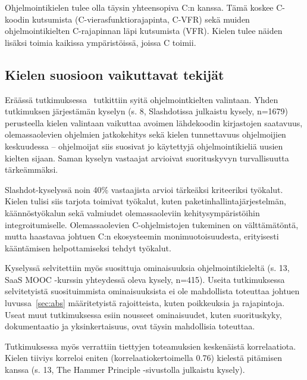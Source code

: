 Ohjelmointikielen tulee olla täysin yhteensopiva C:n kanssa. Tämä koskee
C-koodin kutsumista (C\hyp{}vierasfunktiorajapinta, C-VFR) sekä muiden ohjelmointikielten C-rajapinnan läpi
kutsumista (VFR). Kielen tulee näiden lisäksi toimia kaikissa ympäristöissä,
joissa C toimii.

\subsection{Kielen suosioon vaikuttavat tekijät}

Eräässä tutkimuksessa~\citep{empiricalpopularity} tutkittiin syitä
ohjelmointkielten valintaan. Yhden tutkimuksen järjestämän kyselyn (s. 8,
Slashdotissa julkaistu kysely, n=1679) perusteella kielen valintaan vaikuttaa
avoimen lähdekoodin kirjastojen saatavuus, olemassaolevien ohjelmien
jatkokehitys sekä kielen tunnettavuus ohjelmoijien keskuudessa -- ohjelmoijat
siis suosivat jo käytettyjä ohjelmointikieliä uusien kielten sijaan. Saman
kyselyn vastaajat arvioivat suorituskyvyn turvallisuutta tärkeämmäksi.

Slashdot-kyselyssä noin 40\% vastaajista arvioi tärkeäksi kriteeriksi työkalut.
Kielen tulisi siis tarjota toimivat työkalut, kuten
paketinhallintajärjestelmän, käännöstyökalun sekä
valmiudet olemassaoleviin kehitysympäristöihin integroitumiselle.
Olemassaolevien C-ohjelmistojen tukeminen on välttämätöntä, mutta haastavaa
johtuen C:n ekosysteemin monimuotoisuudesta, erityisesti kääntämisen
helpottamiseksi tehdyt työkalut.

Kyselyssä selvitettiin myös suosittuja ominaisuuksia ohjelmointikieleltä (s.
13, SaaS MOOC -kurssin yhteydessä oleva kysely, n=415). Useita tutkimuksessa
selvitetyistä suosituimmista ominaisuuksista ei ole mahdollista toteuttaa
johtuen luvussa~\ref{sec:abs} määritetyistä rajoitteista, kuten poikkeuksia ja
rajapintoja. Useat muut tutkimuksessa esiin nousseet ominaisuudet, kuten
suorituskyky, dokumentaatio ja yksinkertaisuus, ovat täysin mahdollisia
toteuttaa.

Tutkimuksessa myös verrattiin tiettyjen toteamuksien keskenäistä korrelaatiota.
Kielen tiiviys korreloi eniten
(korrelaatiokertoimella 0.76) kielestä pitämisen kanssa (s. 13, The Hammer
Principle -sivustolla julkaistu kysely).


